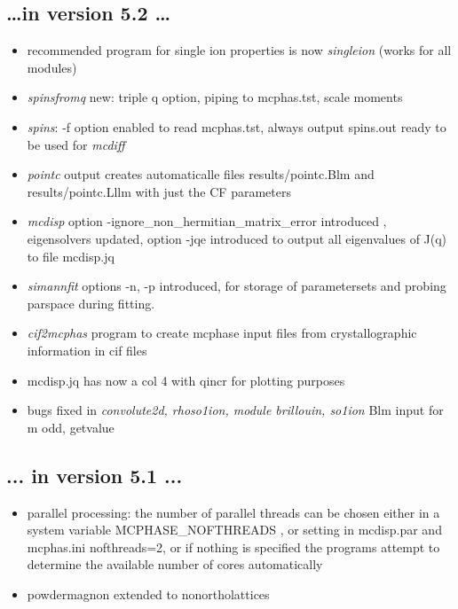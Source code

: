 \documentclass[twoside]{article}
\newcommand{\prg}{\sl}
\begin{document}
\subsection*{ \dots in version 5.2 \dots}
\begin{itemize}
\item recommended program for single ion properties is now {\prg singleion} (works for all modules)
\item {\prg spinsfromq} new: triple q option, piping to mcphas.tst, scale moments 
 \item {\prg   spins}: -f option enabled to read mcphas.tst, always output spins.out 
                 ready to be used for {\prg mcdiff}
\item {\prg pointc} output creates automaticalle files results/pointc.Blm and results/pointc.Lllm with just the CF parameters
\item {\prg mcdisp} option -ignore\_non\_hermitian\_matrix\_error introduced , eigensolvers updated, option -jqe introduced to output all eigenvalues of J(q) to file mcdisp.jq
\item {\prg simannfit} options -n, -p  introduced, for storage of parametersets and probing parspace during fitting.
\item {\prg cif2mcphas} program to create mcphase input files from crystallographic information in cif files
\item mcdisp.jq has now a col 4 with qincr for plotting purposes
\item bugs fixed in {\prg convolute2d, rhoso1ion, module brillouin, so1ion} Blm input for m odd, getvalue
\end{itemize}

\subsection*{ ... in version 5.1 ...}
\begin{itemize}
\item parallel processing: the number of parallel threads can be chosen either in a system variable
MCPHASE\_NOFTHREADS , or setting in mcdisp.par and mcphas.ini nofthreads=2, or if nothing is 
specified the programs attempt to determine the available number of cores automatically
\item powdermagnon extended to nonortholattices 
\end{itemize}
\end{document}
